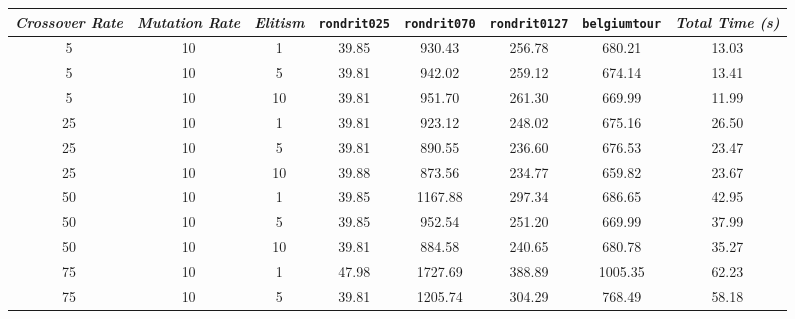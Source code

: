 
\begin{table}[H]
\centering

\footnotesize
{\renewcommand{\arraystretch}{1}}
\begin{tabular}{ccc|c|c|c|c|c}
\textit{Crossover Rate} & \textit{Mutation Rate} & \textit{Elitism} & \texttt{rondrit025} & \texttt{rondrit070} & \texttt{rondrit0127} & \texttt{belgiumtour} & \textit{Total Time (s)} \\\hline
5 & 10 & 1 & \cellcolor{gray!80}39.85 & \cellcolor{gray!46}930.43 & \cellcolor{gray!6}256.78 & \cellcolor{gray!74}680.21 & 13.03\\
5 & 10 & 5 & \cellcolor{gray!80}39.81 & \cellcolor{gray!44}942.02 & \cellcolor{gray!3}259.12 & \cellcolor{gray!76}674.14 & 13.41\\
5 & 10 & 10 & \cellcolor{gray!80}39.81 & \cellcolor{gray!43}951.70 & \cellcolor{gray!1}261.30 & \cellcolor{gray!77}669.99 & 11.99\\
25 & 10 & 1 & \cellcolor{gray!80}39.81 & \cellcolor{gray!48}923.12 & \cellcolor{gray!14}248.02 & \cellcolor{gray!76}675.16 & 26.50\\
25 & 10 & 5 & \cellcolor{gray!80}39.81 & \cellcolor{gray!53}890.55 & \cellcolor{gray!25}236.60 & \cellcolor{gray!75}676.53 & 23.47\\
25 & 10 & 10 & \cellcolor{gray!80}39.88 & \cellcolor{gray!56}873.56 & \cellcolor{gray!26}234.77 & \cellcolor{gray!80}659.82 & 23.67\\
50 & 10 & 1 & \cellcolor{gray!80}39.85 & \cellcolor{gray!7}1167.88 & \cellcolor{gray!1}297.34 & \cellcolor{gray!72}686.65 & 42.95\\
50 & 10 & 5 & \cellcolor{gray!80}39.85 & \cellcolor{gray!43}952.54 & \cellcolor{gray!11}251.20 & \cellcolor{gray!77}669.99 & 37.99\\
50 & 10 & 10 & \cellcolor{gray!80}39.81 & \cellcolor{gray!54}884.58 & \cellcolor{gray!21}240.65 & \cellcolor{gray!74}680.78 & 35.27\\
75 & 10 & 1 & \cellcolor{gray!1}47.98 & \cellcolor{gray!1}1727.69 & \cellcolor{gray!1}388.89 & \cellcolor{gray!1}1005.35 & 62.23\\
75 & 10 & 5 & \cellcolor{gray!80}39.81 & \cellcolor{gray!1}1205.74 & \cellcolor{gray!1}304.29 & \cellcolor{gray!47}768.49 & 58.18\\

\end{tabular}
\end{table}
